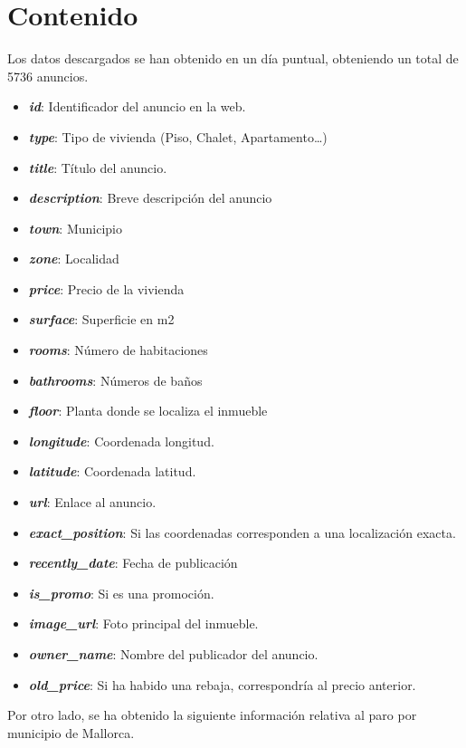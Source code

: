 \documentclass[a4paper, 12pt]{article}
\begin{document}
\section{Contenido}

Los datos descargados se han obtenido en un día puntual, obteniendo un total de 5736 anuncios.

\begin{itemize}
	\item \textbf{{\itshape id}}: Identificador del anuncio en la web.
	\item \textbf{{\itshape type}}: Tipo de vivienda (Piso, Chalet, Apartamento…)
	\item \textbf{{\itshape title}}: Título del anuncio.
	\item \textbf{{\itshape description}}: Breve descripción del anuncio
	\item \textbf{{\itshape town}}: Municipio
	\item \textbf{{\itshape zone}}: Localidad
	\item \textbf{{\itshape price}}: Precio de la vivienda
	\item \textbf{{\itshape surface}}: Superficie en m2
	\item \textbf{{\itshape rooms}}: Número de habitaciones
	\item \textbf{{\itshape bathrooms}}: Números de baños
	\item \textbf{{\itshape floor}}: Planta donde se localiza el inmueble
	\item \textbf{{\itshape longitude}}: Coordenada longitud.
	\item \textbf{{\itshape latitude}}: Coordenada latitud.
	\item \textbf{{\itshape url}}: Enlace al anuncio.
	\item \textbf{{\itshape exact\_position}}: Si las coordenadas corresponden a una localización exacta.
	\item \textbf{{\itshape recently\_date}}: Fecha de publicación
	\item \textbf{{\itshape is\_promo}}: Si es una promoción.
	\item \textbf{{\itshape image\_url}}: Foto principal del inmueble.
	\item \textbf{{\itshape owner\_name}}: Nombre del publicador del anuncio.
	\item \textbf{{\itshape old\_price}}: Si ha habido una rebaja, correspondría al precio anterior.	
\end{itemize}

Por otro lado, se ha obtenido la siguiente información relativa al paro por municipio de Mallorca.
\end{document}
